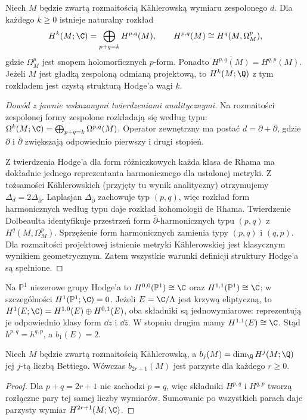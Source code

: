 \begin{twierdzenie}
\label{thm:kahler-hodge-xiv}
Niech $M$ będzie zwartą rozmaitością Kählerowską
wymiaru zespolonego $d$. Dla każdego $k\ge0$
istnieje naturalny rozkład
\[
H^k(M;\C)=\bigoplus_{p+q=k}H^{p,q}(M),
\qquad H^{p,q}(M)\cong H^q(M,\Omega_M^p),
\]
gdzie $\Omega_M^p$ jest snopem holomorficznych $p$-form.
Ponadto $\overline{H^{p,q}(M)}=H^{q,p}(M)$.
Jeżeli $M$ jest gładką zespoloną odmianą projektową,
to $H^k(M;\Q)$ z tym rozkładem jest czystą
strukturą Hodge'a wagi $k$.
\end{twierdzenie}
\begin{proof}[Dowód z jawnie wskazanymi twierdzeniami analitycznymi]
Na rozmaitości zespolonej formy zespolone rozkładają
się według typu: $\Omega^k(M;\C)=
\bigoplus_{p+q=k}\Omega^{p,q}(M)$.
Operator zewnętrzny ma postać
$d=\partial+\bar\partial$,
gdzie $\partial$ i $\bar\partial$ zwiększają
odpowiednio pierwszy i drugi stopień.

Z twierdzenia Hodge'a dla form różniczkowych
każda klasa de Rhama ma dokładnie jednego
reprezentanta harmonicznego dla ustalonej metryki.
Z tożsamości Kählerowskich (przyjęty tu wynik
analityczny) otrzymujemy
$\Delta_d=2\Delta_{\bar\partial}$.
Laplasjan $\Delta_{\bar\partial}$ zachowuje typ
$(p,q)$, więc rozkład form harmonicznych według
typu daje rozkład kohomologii de Rhama.
Twierdzenie Dolbeaulta identyfikuje przestrzeń
form $\bar\partial$-harmonicznych typu $(p,q)$
z $H^q(M,\Omega_M^p)$.
Sprzężenie form harmonicznych zamienia typy
$(p,q)$ i $(q,p)$. Dla rozmaitości projektowej
istnienie metryki Kählerowskiej jest klasycznym
wynikiem geometrycznym. Zatem wszystkie warunki
definicji struktury Hodge'a są spełnione.
\end{proof}

\begin{przyklad}
Na $\mathbb P^1$ niezerowe grupy Hodge'a to
$H^{0,0}(\mathbb P^1)\cong\C$ oraz
$H^{1,1}(\mathbb P^1)\cong\C$; w szczególności
$H^1(\mathbb P^1;\C)=0$.
Jeżeli $E=\C/\Lambda$ jest krzywą eliptyczną,
to $H^1(E;\C)=H^{1,0}(E)\oplus H^{0,1}(E)$,
oba składniki są jednowymiarowe: reprezentują je
odpowiednio klasy form $\dd z$ i $\dd\bar z$.
W stopniu drugim mamy $H^{1,1}(E)\cong\C$.
Stąd $h^{p,q}=h^{q,p}$, a $b_1(E)=2$.
\end{przyklad}

\begin{wniosek}
Niech $M$ będzie zwartą rozmaitością Kählerowską,
a $b_j(M)=\dim_{\Q}H^j(M;\Q)$ jej $j$-tą
liczbą Bettiego. Wówczas $b_{2r+1}(M)$
jest parzyste dla każdego $r\ge0$.
\end{wniosek}
\begin{proof}
Dla $p+q=2r+1$ nie zachodzi $p=q$, więc
składniki $H^{p,q}$ i $H^{q,p}$ tworzą rozłączne
pary tej samej liczby wymiarów. Sumowanie po
wszystkich parach daje parzysty wymiar $H^{2r+1}(M;\C)$.
\end{proof}

